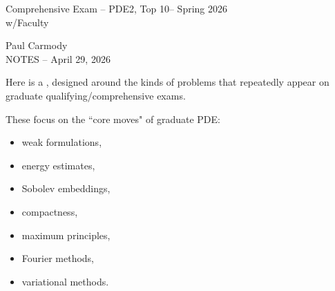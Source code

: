 \documentclass[12pt,a4paper]{report}
\newcommand{\CLASSNAME}{Comprehensive Exam -- PDE2, Top 10}
\newcommand{\STUDENTNAME}{Paul Carmody}
\newcommand{\ASSIGNMENT}{NOTES }
\newcommand{\DUEDATE}{April 29, 2026}
\newcommand{\SEMESTER}{Spring 2026}
\begin{document}
\begin{center}
	\Large{\CLASSNAME -- \SEMESTER} \\
	\large{ w/Faculty}
\end{center}
\begin{center}
	\STUDENTNAME \\
	\ASSIGNMENT -- \DUEDATE\\
\end{center} 


Here is a , designed around the kinds of problems that repeatedly appear on graduate qualifying/comprehensive exams.

These focus on the ``core moves" of graduate PDE:

	\begin{itemize}
    \item weak formulations,
    \item energy estimates,
    \item Sobolev embeddings,
    \item compactness,
    \item maximum principles,
    \item Fourier methods,
    \item variational methods.
	\end{itemize}
\end{document}
